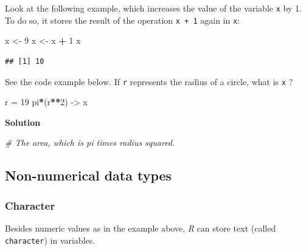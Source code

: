 \documentclass[
]{scrartcl}
\makeatletter
\newenvironment{Shaded}{\begin{snugshade}}{\end{snugshade}}
\newcommand{\CommentTok}[1]{\textcolor[rgb]{0.56,0.35,0.01}{\textit{#1}}}
\newcommand{\DecValTok}[1]{\textcolor[rgb]{0.00,0.00,0.81}{#1}}
\newcommand{\NormalTok}[1]{#1}
\newcommand{\OtherTok}[1]{\textcolor[rgb]{0.56,0.35,0.01}{#1}}
\newcommand{\SpecialCharTok}[1]{\textcolor[rgb]{0.81,0.36,0.00}{\textbf{#1}}}
\newenvironment{kframe}{%
\medskip{}
\setlength{\fboxsep}{.8em}
 \def\at@end@of@kframe{}%
 \ifinner\ifhmode%
  \def\at@end@of@kframe{\end{minipage}}%
  \begin{minipage}{\columnwidth}%
 \fi\fi%
 \def\FrameCommand##1{\hskip\@totalleftmargin \hskip-\fboxsep
 \colorbox{shadecolor}{##1}\hskip-\fboxsep
     \hskip-\linewidth \hskip-\@totalleftmargin \hskip\columnwidth}%
 \MakeFramed {\advance\hsize-\width
   \@totalleftmargin\z@ \linewidth\hsize
   \@setminipage}}%
 {\par\unskip\endMakeFramed%
 \at@end@of@kframe}
\newenvironment{rmdblock}[1]
  {
  \begin{itemize}
  \renewcommand{\labelitemi}{
    \raisebox{-.7\height}[0pt][0pt]{
      {\setkeys{Gin}{width=3em,keepaspectratio}\texttt{[image: images/\#1]}}
    }
  }
  \setlength{\fboxsep}{1em}
  \begin{kframe}
  \item
  }
  {
  \end{kframe}
  \end{itemize}
  }
\newenvironment{myexercise}
    {\begin{rmdblock}{exercise_green}}
    {\end{rmdblock}}
\newenvironment{webexsolution}[1]
    {\par\tiny\textbf{#1}}
    {\par}
\newcommand{\webexhide}[1]{\begin{webexsolution}{#1}}
\newcommand{\webexunhide}{\end{webexsolution}}
\makeatother
\begin{document}
Look at the following example, which increases the value of the variable \texttt{x} by 1. To do so, it stores the result of the operation \texttt{x\ +\ 1} again in \texttt{x}:

\begin{Shaded}
\begin{Highlighting}[]
\NormalTok{x }\OtherTok{\textless{}{-}} \DecValTok{9}
\NormalTok{x }\OtherTok{\textless{}{-}}\NormalTok{ x }\SpecialCharTok{+} \DecValTok{1}
\NormalTok{x}
\end{Highlighting}
\end{Shaded}

\begin{verbatim}
## [1] 10
\end{verbatim}

\begin{myexercise}
See the code example below. If \texttt{r} represents the radius of a
circle, what is \texttt{x} ?
\end{myexercise}

\begin{Shaded}
\begin{Highlighting}[]
\NormalTok{r }\OtherTok{=} \DecValTok{19}
\NormalTok{pi}\SpecialCharTok{*}\NormalTok{(r}\SpecialCharTok{**}\DecValTok{2}\NormalTok{) }\OtherTok{{-}\textgreater{}}\NormalTok{ x}
\end{Highlighting}
\end{Shaded}

\webexhide{Solution}

\begin{Shaded}
\begin{Highlighting}[]
\CommentTok{\# The area, which is pi times radius squared.}
\end{Highlighting}
\end{Shaded}

\webexunhide

\subsection{Non-numerical data types}\label{non-numerical-data-types}

\subsubsection{Character}\label{character}

Besides numeric values as in the example above, \emph{R} can store text (called \texttt{character}) in variables.
\end{document}
